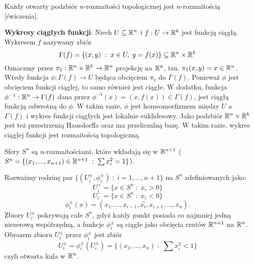 \begin{example}
\item Każdy otwarty podzbiór $n$-rozmaitości topologicznej jest $n$-rozmaitością [ćwiczenia].
    \item \textbf{Wykresy ciągłych funkcji}: Niech $U\subseteq\mathbb{R}^n$ i $f:U\to\mathbb{R}^k$ jest funkcją ciągłą. Wykresem $f$ nazywamy zbiór 
      $$\Gamma(f)=\{(x, y)\;:\;x\in U,\;y=f(x)\}\subseteq\mathbb{R}^n\times\mathbb{R}^k$$
      Oznaczmy przez $\pi_1:\mathbb{R}^n\times\mathbb{R}^k\to\mathbb{R}^n$ projekcję na $\mathbb{R}^n$, tzn. $\pi_1(x, y)=x\in\mathbb{R}^n$. Wtedy funkcja $\phi:\Gamma(f)\to U$ będąca obcięciem $\pi_1$ do $\Gamma(f)$. Ponieważ $\phi$ jest obcięciem funkcji ciągłej, to samo również jest ciągłe. W dodatku, funkcja $\phi^{-1}:\mathbb{R}^n\to\Gamma(f)$ dana przez $\phi^{-1}(x)=(x, f(x))\in\Gamma(f)$, jest ciągłą funkcją odwrotną do $\phi$. W takim razie, $\phi$ jest homeomorfizmem między $U$ a $\Gamma(f)$ i wykres funkcji ciągłych jest lokalnie euklidesowy. Jako podzbiór $\mathbb{R}^n\times\mathbb{R}^k$ jest też przestrzenią Hausdorffa oraz ma przeliczalną bazę. W takim razie, wykres ciągłej funkcji jest rozmaitością topologiczną.
    \item Sfery $S^n$ są $n$-rozmaitościami, które wkładają się w $\mathbb{R}^{n+1}$ ($S^n=\{(x_1,...,x_{n+1})\in\mathbb{R}^{n+1}\;:\;\sum x_i^2=1\}$).

      \begin{center}
\end{center}
  
      Rozważmy rodzinę par $\{(U_i^{\pm},\phi^{\pm}_i)\;:\;i=1,...,n+1\}$ na $S^n$ zdefiniowanych jako:
      $$U_i^+=\{x\in S^n\;:\;x_i>0\}$$
      $$U_i^-=\{x\in S^n\;:\;x_i<0\}$$
      $$\phi_i^{\pm}(x)=(x_1,...,x_{i-1},\hat{x_i},x_{i+1},...,x_n).$$
      Zbiory $U_i^\pm$ pokrywają całe $S^n$, gdyż każdy punkt posiada co najmniej jedną niezerową współrzędną, a funkcje $\phi_i^\pm$ są ciągłe jako obcięcia rzutów $\mathbb{R}^{n+1}$ na $\mathbb{R}^n$. Obrazem zbioru $U_i^{\pm}$ przez $\phi_i^\pm$ jest zbiór
      $$\overline{U_i^\pm}=\phi_i^\pm(U_i^\pm)=\{(x_1,...,x_n)\;:\;\sum x_i^2<1\}$$
      czyli otwarta kula w $\mathbb{R}^n$.


\end{example}
